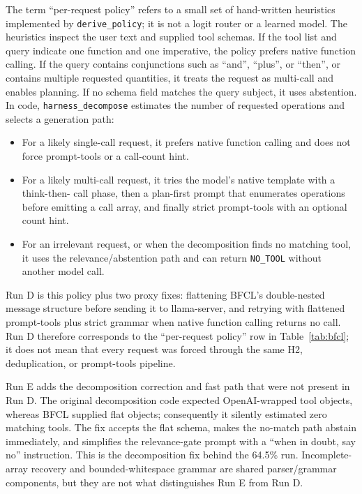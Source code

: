 \documentclass[conference]{IEEEtran}
\begin{document}
The term ``per-request policy'' refers to a small set of hand-written heuristics implemented
by \texttt{derive\_policy}; it is not a logit router or a learned model. The heuristics inspect
the user text and supplied tool schemas. If the tool list and query indicate one function and
one imperative, the policy prefers native function calling. If the query contains conjunctions
such as ``and'', ``plus'', or ``then'', or contains multiple requested quantities, it treats the
request as multi-call and enables planning. If no schema field matches the query subject, it
uses abstention. In code, \texttt{harness\_decompose} estimates the number of requested
operations and selects a generation path:
\begin{itemize}
\item For a likely single-call request, it prefers native function calling and does not force
prompt-tools or a call-count hint.
\item For a likely multi-call request, it tries the model's native template with a think-then-
call phase, then a plan-first prompt that enumerates operations before emitting a call array,
and finally strict prompt-tools with an optional count hint.
\item For an irrelevant request, or when the decomposition finds no matching tool, it uses the
relevance/abstention path and can return \texttt{NO\_TOOL} without another model call.
\end{itemize}

Run D is this policy plus two proxy fixes: flattening BFCL's double-nested message structure
before sending it to llama-server, and retrying with flattened prompt-tools plus strict grammar
when native function calling returns no call. Run D therefore corresponds to the
``per-request policy'' row in Table~\ref{tab:bfcl}; it does not mean that every request was
forced through the same H2, deduplication, or prompt-tools pipeline.

Run E adds the decomposition correction and fast path that were not present in Run D. The
original decomposition code expected OpenAI-wrapped tool objects, whereas BFCL supplied flat
objects; consequently it silently estimated zero matching tools. The fix accepts the flat
schema, makes the no-match path abstain immediately, and simplifies the relevance-gate prompt
with a ``when in doubt, say no'' instruction. This is the decomposition fix behind the 64.5\%
run. Incomplete-array recovery and bounded-whitespace grammar are shared parser/grammar
components, but they are not what distinguishes Run E from Run D.
\end{document}
